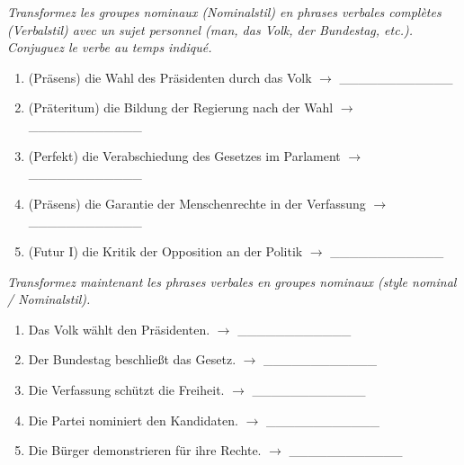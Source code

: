 \documentclass[11pt]{article}
\begin{document}
\begin{exercice}
\emph{Transformez les groupes nominaux (Nominalstil) en phrases verbales complètes (Verbalstil) avec un sujet personnel (man, das Volk, der Bundestag, etc.). Conjuguez le verbe au temps indiqué.}
\begin{enumerate}
    \item (Präsens) die Wahl des Präsidenten durch das Volk $\rightarrow$ \_\_\_\_\_\_\_\_\_\_\_\_
    \item (Präteritum) die Bildung der Regierung nach der Wahl $\rightarrow$ \_\_\_\_\_\_\_\_\_\_\_\_
    \item (Perfekt) die Verabschiedung des Gesetzes im Parlament $\rightarrow$ \_\_\_\_\_\_\_\_\_\_\_\_
    \item (Präsens) die Garantie der Menschenrechte in der Verfassung $\rightarrow$ \_\_\_\_\_\_\_\_\_\_\_\_
    \item (Futur I) die Kritik der Opposition an der Politik $\rightarrow$ \_\_\_\_\_\_\_\_\_\_\_\_
\end{enumerate}
\medskip
\emph{Transformez maintenant les phrases verbales en groupes nominaux (style nominal / Nominalstil).}
\begin{enumerate}
    \item Das Volk wählt den Präsidenten. $\rightarrow$ \_\_\_\_\_\_\_\_\_\_\_\_
    \item Der Bundestag beschließt das Gesetz. $\rightarrow$ \_\_\_\_\_\_\_\_\_\_\_\_
    \item Die Verfassung schützt die Freiheit. $\rightarrow$ \_\_\_\_\_\_\_\_\_\_\_\_
    \item Die Partei nominiert den Kandidaten. $\rightarrow$ \_\_\_\_\_\_\_\_\_\_\_\_
    \item Die Bürger demonstrieren für ihre Rechte. $\rightarrow$ \_\_\_\_\_\_\_\_\_\_\_\_
\end{enumerate}
\end{exercice}
\end{document}
